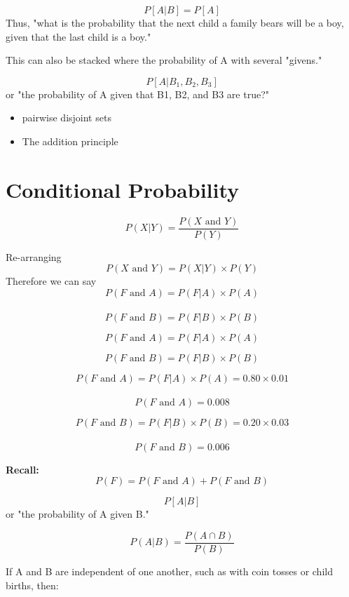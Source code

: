 \documentclass[]{report}
\begin{document}
\[P[A | B] = P[ A ]\]
Thus, "what is the probability that the next child a family bears will be a boy, given that the last child is a boy."

This can also be stacked where the probability of A with several "givens."


\[P[A | B_1, B_2, B_3 ]\]
or "the probability of A given that B1, B2, and B3 are true?"



\begin{itemize}
\item pairwise disjoint sets
\item The addition principle
\end{itemize}


\section{Conditional Probability}

\[ P(X|Y)  = \frac{P(X \mbox{ and } Y)}{P(Y)} \]

Re-arranging
\[ P(X \mbox{ and } Y) =  P(X|Y)\times P(Y) \]
Therefore we can say
\[ P(F \mbox{ and } A) =  P(F|A)\times P(A) \]\\
\[ P(F \mbox{ and } B) =  P(F|B)\times P(B) \]





\[ P(F \mbox{ and } A) =  P(F|A)\times P(A) \]

\[ P(F \mbox{ and } B) =  P(F|B)\times P(B) \]




\[ P(F \mbox{ and } A) =  P(F|A)\times P(A) = 0.80 \times 0.01\]\\
\[ P(F \mbox{ and } A) = 0.008\]

\[ P(F \mbox{ and } B) =  P(F|B)\times P(B) = 0.20 \times 0.03\]\\
\[ P(F \mbox{ and } B) = 0.006\]

\textbf{Recall:}
\[ P(F) = P(F \mbox{ and } A) + P(F \mbox{ and } B) \]








\[P[A | B]\]
or "the probability of A given B."

\[P(A | B) = \frac{P(A\cap B)}{P(B)}\]

If A and B are independent of one another, such as with coin tosses or child births, then:
\end{document}
